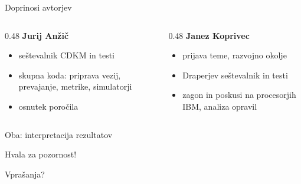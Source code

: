 \documentclass[aspectratio=169,11pt]{beamer}
\begin{document}
\begin{frame}{Doprinosi avtorjev}
\begin{columns}[T]
\begin{column}{0.48\textwidth}
\textbf{Jurij Anžič}
\begin{itemize}
  \item seštevalnik CDKM in testi
  \item skupna koda: priprava vezij, prevajanje, metrike, simulatorji
  \item osnutek poročila
\end{itemize}
\end{column}
\begin{column}{0.48\textwidth}
\textbf{Janez Koprivec}
\begin{itemize}
  \item prijava teme, razvojno okolje
  \item Draperjev seštevalnik in testi
  \item zagon in poskusi na procesorjih IBM, analiza opravil
\end{itemize}
\end{column}
\end{columns}
\vspace{0.5cm}
\centering Oba: interpretacija rezultatov
\end{frame}

\begin{frame}[standout]
Hvala za pozornost!

\vspace{0.5cm}
\normalsize Vprašanja?
\end{frame}
\end{document}
